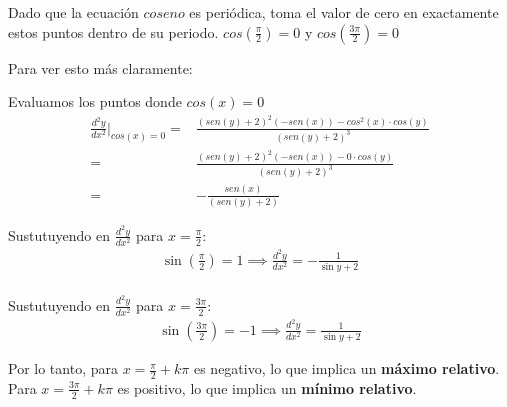 Dado que la ecuación $coseno$ es periódica, toma el valor de cero en exactamente estos puntos dentro de su periodo.
$cos\left(\frac{\pi}{2}\right)=0$ y $cos\left(\frac{3\pi}{2}\right)=0$

Para ver esto más claramente:

Evaluamos los puntos donde $cos(x)=0$
\begin{align*}
	\frac{d^2y}{dx^2}\bigg|_{cos (x)=0}= & \frac{(sen(y)+2)^2\left(-sen(x)\right)-cos^2(x)\cdot cos(y)}{\left(sen(y)+2\right)^3} \\
	=                                          & \frac{(sen(y)+2)^2\left(-sen(x)\right)-0\cdot cos(y)}{\left(sen(y)+2\right)^3}                                     \\
	=                                          & -\frac{sen(x)}{\left(sen(y)+2\right)}                                          
\end{align*}
\vspace{-20px}
\begin{multicols}{2}
    Sustutuyendo en $\frac{d^2y}{dx^2}$ para $x=\frac{\pi}{2}$:
    \noindent
    \begin{align*}
        \sin\left(\frac{\pi}{2}\right) = 1 \implies \frac{d^2y}{dx^2} = -\frac{1}{\sin y + 2}
    \end{align*}
    \columnbreak\\
    Sustutuyendo en $\frac{d^2y}{dx^2}$ para $x=\frac{3\pi}{2}$:
    \begin{align*}
        \sin\left(\frac{3\pi}{2}\right) = -1 \implies \frac{d^2y}{dx^2} = \frac{1}{\sin y + 2}
    \end{align*}
\end{multicols}
\noindent
Por lo tanto, para $x = \frac{\pi}{2}+k\pi$ es negativo, lo que implica un \textbf{máximo relativo}.\\
Para $x = \frac{3\pi}{2}+k\pi$ es positivo, lo que implica un \textbf{mínimo relativo}.

